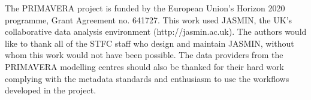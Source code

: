 \documentclass[gmd, manuscript]{copernicus}
\begin{document}






\begin{acknowledgements}
The PRIMAVERA project is funded by the European Union's Horizon 2020 programme, Grant Agreement no. 641727. This work used JASMIN, the UK's collaborative data analysis environment (http://jasmin.ac.uk). The authors would like to thank all of the STFC staff who design and maintain JASMIN, without whom this work would not have been possible. The data providers from the PRIMAVERA modelling centres should also be thanked for their hard work complying with the metadata standards and enthusiasm to use the workflows developed in the project.
\end{acknowledgements}






%
%
%





\end{document}
